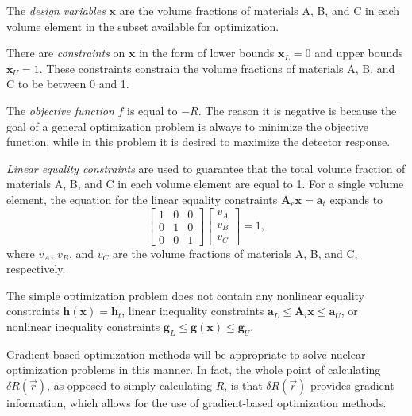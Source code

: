 The \textit{design variables} $\textbf{x}$ are the volume fractions of materials A, B, and C in each volume element in the subset available for optimization.


There are \textit{constraints} on $\textbf{x}$ in the form of lower bounds $\textbf{x}_L = 0$ and upper bounds $\textbf{x}_U = 1$.
These constraints constrain the volume fractions of materials A, B, and C to be between 0 and 1.

The \textit{objective function} $f$ is equal to $-R$.
The reason it is negative is because the goal of a general optimization problem is always to minimize the objective function, while in this problem it is desired to maximize the detector response.

\textit{Linear equality constraints} are used to guarantee that the total volume fraction of materials A, B, and C in each volume element are equal to 1.
For a single volume element, the equation for the linear equality constraints $\textbf{A}_e\textbf{x} = \textbf{a}_t$ expands to
\begin{equation}
  \begin{bmatrix}1 & 0 & 0 \\ 0 & 1 & 0 \\ 0 & 0 & 1\end{bmatrix}
  \begin{bmatrix}v_A       \\ v_B       \\ v_C      \end{bmatrix} = 1,
\end{equation}
where $v_A$, $v_B$, and $v_C$ are the volume fractions of materials A, B, and C, respectively.

The simple optimization problem does not contain any nonlinear equality constraints $\textbf{h}\left(\textbf{x}\right) = \textbf{h}_t$, linear inequality constraints $\textbf{a}_L \leq \textbf{A}_i\textbf{x} \leq \textbf{a}_U$, or nonlinear inequality constraints $\textbf{g}_L \leq \textbf{g}\left(\textbf{x}\right) \leq \textbf{g}_U$.

Gradient-based optimization methods will be appropriate to solve nuclear optimization problems in this manner.
In fact, the whole point of calculating $\delta R\left(\vec{r}\right)$, as opposed to simply calculating $R$, is that $\delta R\left(\vec{r}\right)$ provides gradient information, which allows for the use of gradient-based optimization methods.

